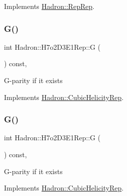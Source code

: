 Implements \mbox{\hyperlink{structHadron_1_1RepRep_a92c8802e5ed7afd7da43ccfd5b7cd92b}{Hadron\+::\+Rep\+Rep}}.

\mbox{\label{structHadron_1_1H7o2D3E1Rep_aa0ecdf06110537889da13443632785a6}} 
\subsubsection{\texorpdfstring{G()}{G()}\hspace{0.1cm}{\footnotesize\ttfamily [1/3]}}
{\footnotesize\ttfamily int Hadron\+::\+H7o2\+D3\+E1\+Rep\+::G (\begin{DoxyParamCaption}{ }\end{DoxyParamCaption}) const\hspace{0.3cm}{\ttfamily [inline]}, {\ttfamily [virtual]}}

G-\/parity if it exists 

Implements \mbox{\hyperlink{structHadron_1_1CubicHelicityRep_a50689f42be1e6170aa8cf6ad0597018b}{Hadron\+::\+Cubic\+Helicity\+Rep}}.

\mbox{\label{structHadron_1_1H7o2D3E1Rep_aa0ecdf06110537889da13443632785a6}} 
\subsubsection{\texorpdfstring{G()}{G()}\hspace{0.1cm}{\footnotesize\ttfamily [2/3]}}
{\footnotesize\ttfamily int Hadron\+::\+H7o2\+D3\+E1\+Rep\+::G (\begin{DoxyParamCaption}{ }\end{DoxyParamCaption}) const\hspace{0.3cm}{\ttfamily [inline]}, {\ttfamily [virtual]}}

G-\/parity if it exists 

Implements \mbox{\hyperlink{structHadron_1_1CubicHelicityRep_a50689f42be1e6170aa8cf6ad0597018b}{Hadron\+::\+Cubic\+Helicity\+Rep}}.

\mbox{\label{structHadron_1_1H7o2D3E1Rep_aa0ecdf06110537889da13443632785a6}} 
